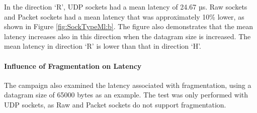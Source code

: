 In the direction `R', UDP sockets had a mean latency of 24.67 µs. Raw sockets and Packet sockets had a mean latency that was approximately 10\% lower, as shown in Figure \ref{fig:SockTypeMl:b}. The figure also demonstrates that the mean latency increases also in this direction when the datagram size is increased. The mean latency in direction `R' is lower than that in direction `H'.

\paragraph{Influence of Fragmentation on Latency}

The campaign also examined the latency associated with fragmentation, using a datagram size of 65000 bytes as an example. The test was only performed with UDP sockets, as Raw and Packet sockets do not support fragmentation.


